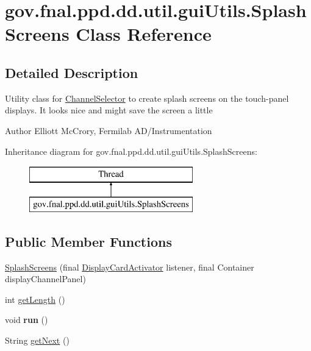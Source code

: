 \hypertarget{classgov_1_1fnal_1_1ppd_1_1dd_1_1util_1_1guiUtils_1_1SplashScreens}{\section{gov.\-fnal.\-ppd.\-dd.\-util.\-gui\-Utils.\-Splash\-Screens Class Reference}
\label{classgov_1_1fnal_1_1ppd_1_1dd_1_1util_1_1guiUtils_1_1SplashScreens}
}


\subsection{Detailed Description}
Utility class for \hyperlink{classgov_1_1fnal_1_1ppd_1_1dd_1_1ChannelSelector}{Channel\-Selector} to create splash screens on the touch-\/panel displays. It looks nice and might save the screen a little

\begin{DoxyAuthor}{Author}
Elliott Mc\-Crory, Fermilab A\-D/\-Instrumentation 
\end{DoxyAuthor}
Inheritance diagram for gov.\-fnal.\-ppd.\-dd.\-util.\-gui\-Utils.\-Splash\-Screens\-:\begin{figure}[H]
\begin{center}
\leavevmode
\includegraphics[height=2.000000cm]{classgov_1_1fnal_1_1ppd_1_1dd_1_1util_1_1guiUtils_1_1SplashScreens}
\end{center}
\end{figure}
\subsection*{Public Member Functions}
\begin{DoxyCompactItemize}
\item 
\hyperlink{classgov_1_1fnal_1_1ppd_1_1dd_1_1util_1_1guiUtils_1_1SplashScreens_a3b01fff5fc7c9d20e1229bd9441d66ce}{Splash\-Screens} (final \hyperlink{interfacegov_1_1fnal_1_1ppd_1_1dd_1_1interfaces_1_1DisplayCardActivator}{Display\-Card\-Activator} listener, final Container display\-Channel\-Panel)
\item 
int \hyperlink{classgov_1_1fnal_1_1ppd_1_1dd_1_1util_1_1guiUtils_1_1SplashScreens_aa72109c01206e7fc3866440d8d9680be}{get\-Length} ()
\item 
\hypertarget{classgov_1_1fnal_1_1ppd_1_1dd_1_1util_1_1guiUtils_1_1SplashScreens_af5353d7417b0c9b0c3955e34fc40619c}{void {\bfseries run} ()}\label{classgov_1_1fnal_1_1ppd_1_1dd_1_1util_1_1guiUtils_1_1SplashScreens_af5353d7417b0c9b0c3955e34fc40619c}

\item 
String \hyperlink{classgov_1_1fnal_1_1ppd_1_1dd_1_1util_1_1guiUtils_1_1SplashScreens_a19bce9c642238c470303f72048935cd1}{get\-Next} ()
\end{DoxyCompactItemize}
